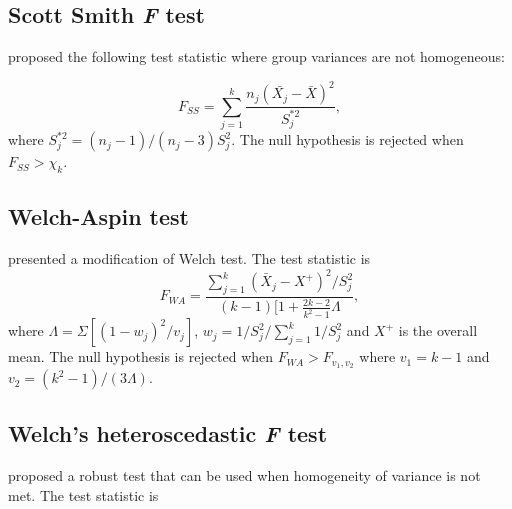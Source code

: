 \subsection{Scott Smith \textit{F} test}
\cite{scott1971interval} proposed the following test statistic where group variances are not homogeneous:

\begin{equation}
F_{SS}=\displaystyle\sum\limits_{j=1}^k\frac{n_j(\bar{X_j}-\bar{X})^2}{S_j^{*2}},    
\end{equation}
where \begin{math}
S_j^{*2}=(n_j-1)/(n_j-3)S_j^{2}
\end{math}.
The null hypothesis is rejected when \begin{math} F_{SS}>\chi_{k} \end{math}.


\subsection{Welch-Aspin test}
\citet{aspin1948} presented a modification of Welch test. The test statistic is
\begin{equation}
F_{WA}=\frac{\displaystyle\sum\limits_{j=1}^k(\bar{X}_{j}-{X^+})^2/S_j^2}{(k-1)[1+\frac{2k-2}{k^2-1}\Lambda},
\end{equation}
where
\begin{math}
\Lambda=\Sigma[(1-w_j)^2/v_j]
\end{math}, 
\begin{math}
w_j={1/S_j^2}/{\displaystyle\sum\limits_{j=1}^k1/S_j^2}
\end{math} and \begin{math} X^+ \end{math} is the overall mean.
The null hypothesis is rejected when \begin{math}
F_{WA}> F_{v_1,v_2} 
\end{math} where \begin{math} v_1=k-1 \end{math} and
\begin{math} v_2=(k^2-1)/(3\Lambda) \end{math}.



\subsection{Welch's heteroscedastic \textit{F} test}

\citet{WELCH:1951} proposed a robust test that can be used when homogeneity of variance is not met. The test statistic is


